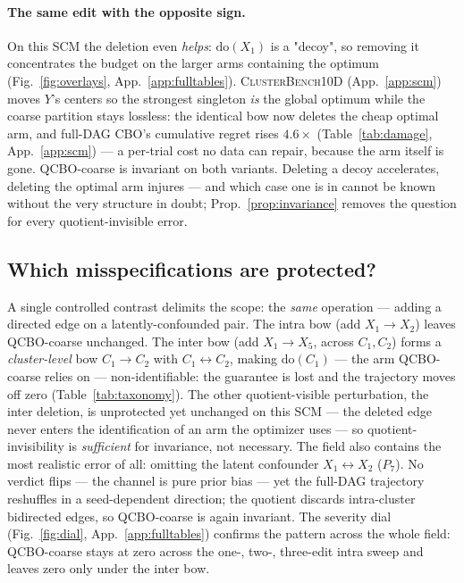 \documentclass[twoside]{article}
\newcommand{\doo}{\mathrm{do}}
\newcommand{\QCBO}{\textsc{QCBO}}
\newcommand{\CBO}{\textsc{CBO}}
\begin{document}
\paragraph{The same edit with the opposite sign.}
On this SCM the deletion even \emph{helps}: $\doo(X_1)$ is a "decoy", so removing it concentrates the budget on the larger arms containing the optimum (Fig.~\ref{fig:overlays}, App.~\ref{app:fulltables}). \textsc{ClusterBench10D} (App.~\ref{app:scm}) moves $Y$'s centers so the strongest singleton \emph{is} the global optimum while the coarse partition stays lossless: the identical bow now deletes the cheap optimal arm, and full-DAG \CBO{}'s cumulative regret rises $4.6\times$ (Table~\ref{tab:damage}, App.~\ref{app:scm}) --- a per-trial cost no data can repair, because the arm itself is gone. \QCBO{}-coarse is invariant on both variants. Deleting a decoy accelerates, deleting the optimal arm injures --- and which case one is in cannot be known without the very structure in doubt; Prop.~\ref{prop:invariance} removes the question for every quotient-invisible error.

\begin{table}[t]\centering
  \caption{Sample efficiency on ClusterBench10 under the \emph{correct} DAG
  (mean$\pm$s.e., $10$ seeds, $T{=}100$; higher GAP/PA-GAP and lower
  $r_T$/$R_T$ are better).}
  \label{tab:headline}
\end{table}

\subsection{Which misspecifications are protected?}
\label{sec:exp-scope}
A single controlled contrast delimits the scope: the \emph{same} operation --- adding a directed edge on a latently-confounded pair. The intra bow (add $X_1\!\to\!X_2$) leaves \QCBO{}-coarse unchanged. The inter bow (add $X_1\!\to\!X_5$, across $C_1,C_2$) forms a \emph{cluster-level} bow $C_1\to C_2$ with $C_1\leftrightarrow C_2$, making $\doo(C_1)$ --- the arm \QCBO{}-coarse relies on --- non-identifiable: the guarantee is lost and the trajectory moves off zero (Table~\ref{tab:taxonomy}). The other quotient-visible perturbation, the inter deletion, is unprotected yet unchanged on this SCM --- the deleted edge never enters the identification of an arm the optimizer uses --- so quotient-invisibility is \emph{sufficient} for invariance, not necessary. The field also contains the most realistic error of all: omitting the latent confounder $X_1\!\leftrightarrow\!X_2$ ($P_7$). No verdict flips --- the channel is pure prior bias --- yet the full-DAG trajectory reshuffles in a seed-dependent direction; the quotient discards intra-cluster bidirected edges, so \QCBO{}-coarse is again invariant. The severity dial (Fig.~\ref{fig:dial}, App.~\ref{app:fulltables}) confirms the pattern across the whole field: \QCBO{}-coarse stays at zero across the one-, two-, three-edit intra sweep and leaves zero only under the inter bow.
\end{document}
